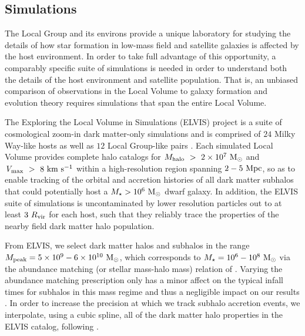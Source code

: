 \documentclass[usenatbib]{mnras}
\newcommand{\vmax}{{\it V}_{\rm{max}}}
\newcommand{\mhalo}{{M}_{\rm{halo}}}
\newcommand{\mpeak}{{M}_{\rm{peak}}}
\newcommand{\rvir}{R_{\rm vir}}
\newcommand{\mstar}{{M}_{\star}}
\newcommand{\msun}{{\rm M}_{\odot}}
\newcommand{\gt}{>}
\begin{document}
\subsection{Simulations}
\label{subsec:simdata}

The Local Group and its environs provide a unique laboratory for studying the
details of how star formation in low-mass field and satellite galaxies is
affected by the host environment.  In order to take full advantage of this
opportunity, a comparably specific suite of simulations is needed in order to
understand both the details of the host environment and satellite population.
That is, an unbiased comparison of observations in the Local Volume to galaxy
formation and evolution theory requires simulations that span the entire Local
Volume.
%

The Exploring the Local Volume in Simulations (ELVIS) project is a
suite of cosmological zoom-in dark matter-only simulations and is
comprised of $24$ Milky Way-like hosts as well as $12$ Local Group-like
pairs \citep{GK14}.
%
Each simulated Local Volume provides complete halo catalogs for
$\mhalo~\gt~2\times 10^{7}~\msun$ and $\vmax~>~8~{\rm km}~{\rm s}^{-1}$ within a
high-resolution region spanning $2-5~{\rm Mpc}$, so as to enable tracking of the
orbital and accretion histories of all dark matter subhalos that could
potentially host a $\mstar > 10^{6}~\msun$ dwarf galaxy. In addition, the ELVIS
suite of simulations is uncontaminated by lower resolution particles out to at
least $3~\rvir$ for each host, such that they reliably trace the properties of
the nearby field dark matter halo population.



From ELVIS, we select dark matter halos and subhalos in the range
$\mpeak = 5\times 10^{9} - 6\times 10^{10}~\msun$, which corresponds to
$\mstar = 10^{6} - 10^{8}~\msun$ via the abundance matching (or stellar
mass-halo mass) relation of \citet{GK14}.
%
Varying the abundance matching prescription only has a minor affect on the
typical infall times for subhalos in this mass regime and thus a
negligible impact on our results \citep{fham15}. 
%
In order to increase the precision at which we track subhalo accretion events,
we interpolate, using a cubic spline, all of the dark matter halo
properties in the ELVIS catalog, following \citet{fham15}.
%

\end{document}
